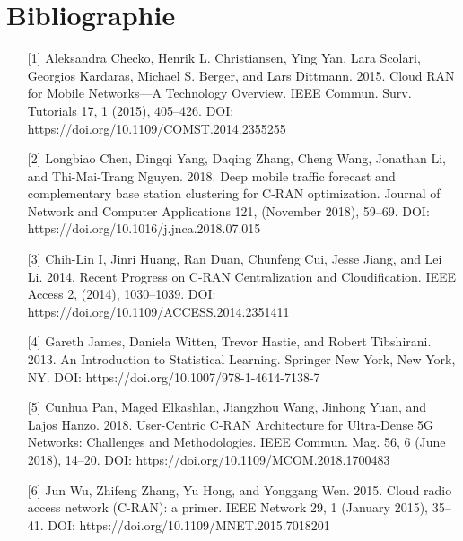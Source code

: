 \documentclass{report}
\begin{document}
\section*{Bibliographie}
\begin{enumerate}
\item[{[1]}] Aleksandra Checko, Henrik L. Christiansen, Ying Yan, Lara Scolari, Georgios Kardaras, Michael S. Berger, and Lars Dittmann. 2015. Cloud RAN for Mobile Networks—A Technology Overview. IEEE Commun. Surv. Tutorials 17, 1 (2015), 405–426. DOI: https://doi.org/10.1109/COMST.2014.2355255
\item[{[2]}] Longbiao Chen, Dingqi Yang, Daqing Zhang, Cheng Wang, Jonathan Li, and Thi-Mai-Trang Nguyen. 2018. Deep mobile traffic forecast and complementary base station clustering for C-RAN optimization. Journal of Network and Computer Applications 121, (November 2018), 59–69. DOI: https://doi.org/10.1016/j.jnca.2018.07.015
\item[{[3]}] Chih-Lin I, Jinri Huang, Ran Duan, Chunfeng Cui, Jesse Jiang, and Lei Li. 2014. Recent Progress on C-RAN Centralization and Cloudification. IEEE Access 2, (2014), 1030–1039. DOI: https://doi.org/10.1109/ACCESS.2014.2351411
\item[{[4]}] Gareth James, Daniela Witten, Trevor Hastie, and Robert Tibshirani. 2013. An Introduction to Statistical Learning. Springer New York, New York, NY. DOI: https://doi.org/10.1007/978-1-4614-7138-7
\item[{[5]}] Cunhua Pan, Maged Elkashlan, Jiangzhou Wang, Jinhong Yuan, and Lajos Hanzo. 2018. User-Centric C-RAN Architecture for Ultra-Dense 5G Networks: Challenges and Methodologies. IEEE Commun. Mag. 56, 6 (June 2018), 14–20. DOI: https://doi.org/10.1109/MCOM.2018.1700483
\item[{[6]}] Jun Wu, Zhifeng Zhang, Yu Hong, and Yonggang Wen. 2015. Cloud radio access network (C-RAN): a primer. IEEE Network 29, 1 (January 2015), 35–41. DOI: https://doi.org/10.1109/MNET.2015.7018201



\end{enumerate}
\end{document}
